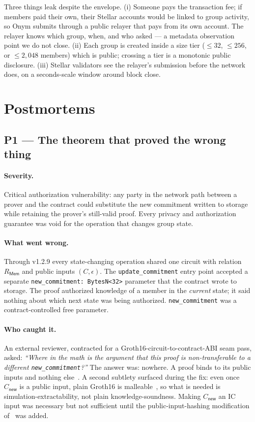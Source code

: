 \documentclass[11pt,a4paper]{article}
\newcommand{\Cnew}{C_{\mathsf{new}}}
\newcommand{\Rmem}{R_{\mathsf{Mem}}}
\begin{document}
Three things leak despite the envelope. (i) Someone pays the transaction fee; if members paid their own, their Stellar accounts would be linked to group activity, so Onym submits through a public relayer that pays from its own account. The relayer knows which group, when, and who asked --- a metadata observation point we do not close. (ii) Each group is created inside a size tier ($\leq 32$, $\leq 256$, or $\leq 2{,}048$ members) which is public; crossing a tier is a monotonic public disclosure. (iii) Stellar validators see the relayer's submission before the network does, on a seconds-scale window around block close.

\section{Postmortems}
\label{sec:postmortems}

\subsection{P1 --- The theorem that proved the wrong thing}
\label{sec:p1}

\paragraph{Severity.}
Critical authorization vulnerability: any party in the network path between a prover and the contract could substitute the new commitment written to storage while retaining the prover's still-valid proof. Every privacy and authorization guarantee was void for the operation that changes group state.

\paragraph{What went wrong.}
Through v1.2.9 every state-changing operation shared one circuit with relation $\Rmem$ and public inputs $(C, \epsilon)$. The \texttt{update\_commitment} entry point accepted a separate \texttt{new\_commitment: BytesN<32>} parameter that the contract wrote to storage. The proof authorized knowledge of a member in the \emph{current} state; it said nothing about which next state was being authorized. \texttt{new\_commitment} was a contract-controlled free parameter.

\paragraph{Who caught it.}
An external reviewer, contracted for a Groth16-circuit-to-contract-ABI seam pass, asked: \emph{``Where in the math is the argument that this proof is non-transferable to a different \texttt{new\_commitment}?''} The answer was: nowhere. A proof binds to its public inputs and nothing else~\cite{groth2016, lipmaa2019}. A second subtlety surfaced during the fix: even once $\Cnew$ is a public input, plain Groth16 is malleable~\cite{grothmaller2017}, so what is needed is simulation-extractability, not plain knowledge-soundness. Making $\Cnew$ an IC input was necessary but not sufficient until the public-input-hashing modification of~\cite{baghery2021} was added.
\end{document}
